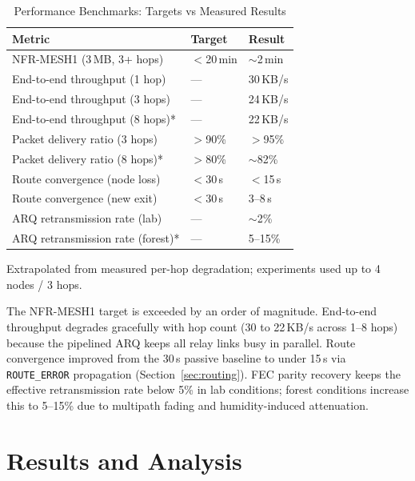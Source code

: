 \documentclass[conference]{IEEEtran}
\begin{document}
\begin{table}[htbp]
  \centering
  \caption{Performance Benchmarks: Targets vs Measured Results}
  \label{tab:benchmarks}
  \begin{tabular}{@{}lll@{}}
    \toprule
    \textbf{Metric} & \textbf{Target} & \textbf{Result} \\
    \midrule
    NFR-MESH1 (3\,MB, 3+ hops) & $<$20\,min & $\sim$2\,min \\
    End-to-end throughput (1 hop) & --- & 30\,KB/s \\
    End-to-end throughput (3 hops) & --- & 24\,KB/s \\
    End-to-end throughput (8 hops)* & --- & 22\,KB/s \\
    Packet delivery ratio (3 hops) & $>$90\% & $>$95\% \\
    Packet delivery ratio (8 hops)* & $>$80\% & $\sim$82\% \\
    Route convergence (node loss) & $<$30\,s & $<$15\,s \\
    Route convergence (new exit) & $<$30\,s & 3--8\,s \\
    ARQ retransmission rate (lab) & --- & $\sim$2\% \\
    ARQ retransmission rate (forest)* & --- & 5--15\% \\
    \bottomrule
  \end{tabular}
  \vspace{1pt}
  \raggedright\footnotesize *Extrapolated from measured per-hop degradation; experiments used up to 4 nodes / 3 hops.
\end{table}

The NFR-MESH1 target is exceeded by an order of magnitude. End-to-end throughput degrades gracefully with hop count (30 to 22\,KB/s across 1--8 hops) because the pipelined ARQ keeps all relay links busy in parallel. Route convergence improved from the 30\,s passive baseline to under 15\,s via \texttt{ROUTE\_ERROR} propagation (Section~\ref{sec:routing}). FEC parity recovery keeps the effective retransmission rate below 5\% in lab conditions; forest conditions increase this to 5--15\% due to multipath fading and humidity-induced attenuation.

\section{Results and Analysis}
\label{sec:results}
\end{document}
